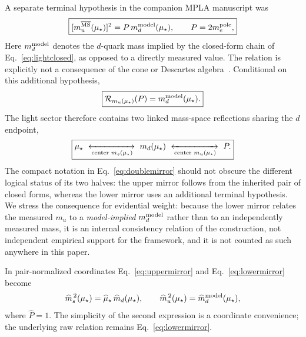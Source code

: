 \documentclass[aps,twocolumn,superscriptaddress,nofootinbib,floatfix]{revtex4-2}
\newcommand{\MSbar}{\overline{\mathrm{MS}}}
\newcommand{\mstar}{\mu_\star}
\newcommand{\RR}{\mathcal R}
\begin{document}
A separate terminal hypothesis in the companion MPLA manuscript was
\begin{equation}
\boxed{[m_u^{\MSbar}(\mstar)]^2=P\,m_d^{\rm model}(\mstar),\qquad P=2m_e^{\rm pole},}
\label{eq:lowermirror}
\end{equation}
Here $m_d^{\rm model}$ denotes the $d$-quark mass implied by the closed-form chain of Eq.~\eqref{eq:lightclosed}, as opposed to a directly measured value. The relation is explicitly not a consequence of the cone or Descartes algebra~\cite{BrilliantMPLA}. Conditional on this additional hypothesis,
\begin{equation}
\boxed{\RR_{m_u(\mstar)}(P)=m_d^{\rm model}(\mstar).}
\label{eq:Rlower}
\end{equation}
The light sector therefore contains two linked mass-space reflections sharing the $d$ endpoint,
\begin{equation}
\boxed{
\mstar\ \xleftrightarrow[\text{center }m_s(\mstar)]{}\ m_d(\mstar)
\ \xleftrightarrow[\text{center }m_u(\mstar)]{}\ P .}
\label{eq:doublemirror}
\end{equation}
The compact notation in Eq.~\eqref{eq:doublemirror} should not obscure the different logical status of its two halves: the upper mirror follows from the inherited pair of closed forms, whereas the lower mirror uses an additional terminal hypothesis. We stress the consequence for evidential weight: because the lower mirror relates the measured $m_u$ to a \emph{model-implied} $m_d^{\rm model}$ rather than to an independently measured mass, it is an internal consistency relation of the construction, not independent empirical support for the framework, and it is not counted as such anywhere in this paper.

In pair-normalized coordinates Eq.~\eqref{eq:uppermirror} and Eq.~\eqref{eq:lowermirror} become
\begin{equation}
\widehat m_s^{\,2}(\mstar)=\widehat\mstar\,\widehat m_d(\mstar),
\qquad
\widehat m_u^{\,2}(\mstar)=\widehat m_d^{\rm model}(\mstar),
\label{eq:hattedlight}
\end{equation}
where $\widehat P=1$. The simplicity of the second expression is a coordinate convenience; the underlying raw relation remains Eq.~\eqref{eq:lowermirror}.
\end{document}
